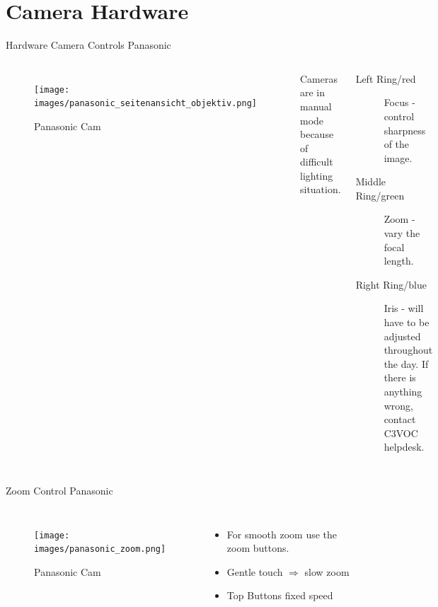 \documentclass[aspectratio=169]{beamer}
\begin{document}
\section{Camera Hardware}
\begin{frame}{Hardware Camera Controls Panasonic}
	\begin{columns}[T,onlytextwidth]
	\begin{figure} 
		\centering
		\texttt{[image: images/panasonic\_seitenansicht\_objektiv.png]}
		\caption{Panasonic Cam}
	\end{figure}
		Cameras are in manual mode because of difficult lighting situation.
		\begin{description}
			\item[Left Ring/red] Focus - control sharpness of the image.
			\item[Middle Ring/green] Zoom - vary the focal length.
			\item[Right Ring/blue] Iris - will have to be adjusted throughout the day. If there is anything wrong, contact C3VOC helpdesk.
		\end{description}
	\end{columns}
\end{frame}


\begin{frame}{Zoom Control Panasonic}
	\begin{columns}[T,onlytextwidth]
	\begin{figure} 
		\centering
		\texttt{[image: images/panasonic\_zoom.png]}
		\caption{Panasonic Cam}
	\end{figure}
		\begin{itemize}
			\item For smooth zoom use the zoom buttons.
			\item Gentle touch $\Rightarrow$ slow zoom
			\item Top Buttons fixed speed
		\end{itemize}
	\end{columns}
\end{frame}
\end{document}
